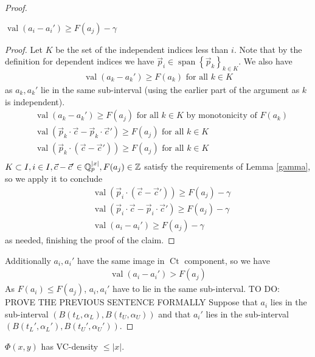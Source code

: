 \documentclass{amsart}
\newcommand{\curly}[1]{\left\{#1\right\}}
\newcommand{\paren}[1]{\left(#1\right)}
\DeclareMathOperator{\Ct}{Ct}
\DeclareMathOperator{\vecspan}{span}
\DeclareMathOperator{\val}{val}
\begin{document}
\begin{proof}
  \begin{Claim}
    $\val(a_i - a_i') \geq F(a_j) - \gamma$
  \end{Claim}
  \begin{proof}
    Let $K$ be the set of the independent indices less than $i$.
    Note that by the definition for dependent indices we have $\vec p_i \in \vecspan \curly{\vec p_k}_{k \in K}$.
    We also have 
    \begin{align*}
      \val(a_k - a_k') \geq F(a_k) \text { for all } k \in K
    \end{align*}
    as $a_k, a_k'$ lie in the same sub-interval (using the earlier part of the argument as $k$ is independent).
    \begin{align*}
      &\val(a_k - a_k') \geq F(a_j) \text { for all } k \in K \text{ by monotonicity of $F(a_k)$} \\
      &\val(\vec p_k \cdot \vec c - \vec p_k \cdot \vec c') \geq F(a_j) \text { for all } k \in K \\
      &\val(\vec p_k \cdot (\vec c - \vec c')) \geq F(a_j) \text { for all } k \in K \\
    \end{align*}
    $K \subset I, i \in I, \vec c - \vec c' \in \mathbb{Q}_p^{|x|}, F(a_j) \in \mathbb{Z}$
    satisfy the requirements of Lemma \ref {gamma}, so we apply it to conclude
    \begin{align*}
      &\val(\vec p_i \cdot (\vec c - \vec c')) \geq F(a_j) - \gamma \\
      &\val(\vec p_i \cdot \vec c - \vec p_i \cdot \vec c') \geq F(a_j) - \gamma \\
      &\val(a_i - a_i') \geq F(a_j) - \gamma
    \end{align*}
    as needed, finishing the proof of the claim.
  \end{proof}	
  Additionally $a_i, a_i'$ have the same image in $\Ct$ component, so we have
  \begin{align*}
    \val(a_i - a_i') > F(a_j) 
  \end{align*}
  As $F(a_i) \leq F(a_j)$, $a_i, a_i'$ have to lie in the same sub-interval.	
  TO DO: PROVE THE PREVIOUS SENTENCE FORMALLY
  Suppose that $a_i$ lies in the sub-interval $\paren{B(t_L, \alpha_L),  B(t_U, \alpha_U)}$
  and that $a_i'$ lies in the sub-interval $\paren{B(t_L', \alpha_L'),  B(t_U', \alpha_U')}$.
\end{proof}

\begin{Corollary}
  $\Phi(x,y)$ has VC-density $\leq |x|$.
\end{Corollary}
\end{document}
